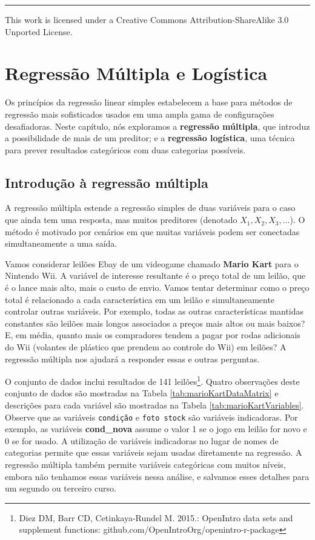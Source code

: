 \documentclass[
]{book}
\theoremstyle{definition}
\theoremstyle{definition}
\theoremstyle{definition}
\theoremstyle{definition}
\theoremstyle{remark}
\begin{document}
\begin{center}\rule{0.5\linewidth}{0.5pt}\end{center}

This work is licensed under a Creative Commons Attribution-ShareAlike 3.0 Unported License.

\hypertarget{ch8-reg-mult-log}{%
\chapter{Regressão Múltipla e Logística}\label{ch8-reg-mult-log}}

Os princípios da regressão linear simples estabelecem a base para métodos de regressão mais sofisticados usados em uma ampla gama de configurações desafiadoras. Neste capítulo, nós exploramos a \textbf{regressão múltipla}, que introduz a possibilidade de mais de um preditor; e a \textbf{regressão logística}, uma técnica para prever resultados categóricos com duas categorias possíveis.

\hypertarget{introductionToMultipleRegression}{%
\section{Introdução à regressão múltipla}\label{introductionToMultipleRegression}}

A regressão múltipla estende a regressão simples de duas variáveis para o caso que ainda tem uma resposta, mas muitos preditores (denotado \(X_1, X_2, X_3, \dots\)). O método é motivado por cenários em que muitas variáveis podem ser conectadas simultaneamente a uma saída.

Vamos considerar leilões Ebay de um videogame chamado \textbf{Mario Kart} para o Nintendo Wii. A variável de interesse resultante é o preço total de um leilão, que é o lance mais alto, mais o custo de envio. Vamos tentar determinar como o preço total é relacionado a cada característica em um leilão e simultaneamente controlar outras variáveis. Por exemplo, todas as outras características mantidas constantes são leilões mais longos associados a preços mais altos ou mais baixos? E, em média, quanto mais os compradores tendem a pagar por rodas adicionais do Wii (volantes de plástico que prendem ao controle do Wii) em leilões? A regressão múltipla nos ajudará a responder essas e outras perguntas.

O conjunto de dados inclui resultados de 141 leilões\footnote{Diez DM, Barr CD, Cetinkaya-Rundel M. 2015.: OpenIntro data sets and supplement functions: github.com/OpenIntroOrg/openintro-r-package}. Quatro observações deste conjunto de dados são mostradas na Tabela \ref{tab:marioKartDataMatrix} e descrições para cada variável são mostradas na Tabela \ref{tab:marioKartVariables}. Observe que as variáveis \texttt{condição} e \texttt{foto\ stock} são variáveis indicadoras. Por exemplo, as variáveis \textbf{cond\_nova} assume o valor 1 se o jogo em leilão for novo e 0 se for usado. A utilização de variáveis indicadoras no lugar de nomes de categorias permite que essas variáveis sejam usadas diretamente na regressão. A regressão múltipla também permite variáveis categóricas com muitos níveis, embora não tenhamos essas variáveis nessa análise, e salvamos esses detalhes para um segundo ou terceiro curso.
\end{document}
